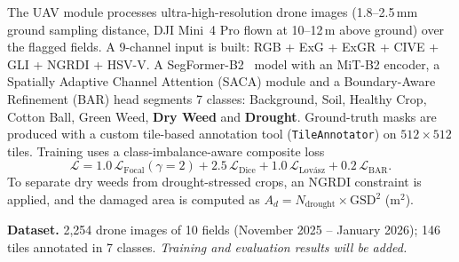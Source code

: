 \documentclass[11pt,a4paper,oneside]{article}
\begin{document}
The UAV module processes ultra-high-resolution drone images (1.8--2.5\,mm ground sampling distance, DJI Mini~4 Pro flown at 10--12\,m above ground) over the flagged fields. A 9-channel input is built: RGB + ExG + ExGR + CIVE + GLI + NGRDI + HSV-V. A SegFormer-B2~\cite{segformer2021} model with an MiT-B2 encoder, a Spatially Adaptive Channel Attention (SACA) module and a Boundary-Aware Refinement (BAR) head segments 7 classes: Background, Soil, Healthy Crop, Cotton Ball, Green Weed, \textbf{Dry Weed} and \textbf{Drought}. Ground-truth masks are produced with a custom tile-based annotation tool (\texttt{TileAnnotator}) on $512 \times 512$ tiles. Training uses a class-imbalance-aware composite loss
\begin{equation}
\mathcal{L} = 1.0\,\mathcal{L}_{\text{Focal}}(\gamma=2) + 2.5\,\mathcal{L}_{\text{Dice}} + 1.0\,\mathcal{L}_{\text{Lov\'{a}sz}} + 0.2\,\mathcal{L}_{\text{BAR}}.
\end{equation}
To separate dry weeds from drought-stressed crops, an NGRDI constraint is applied, and the damaged area is computed as $A_d = N_{\text{drought}} \times \mathrm{GSD}^2$ (m$^2$).

\textbf{Dataset.} 2,254 drone images of 10 fields (November 2025 -- January 2026); 146 tiles annotated in 7 classes. \textit{Training and evaluation results will be added.}
\end{document}
